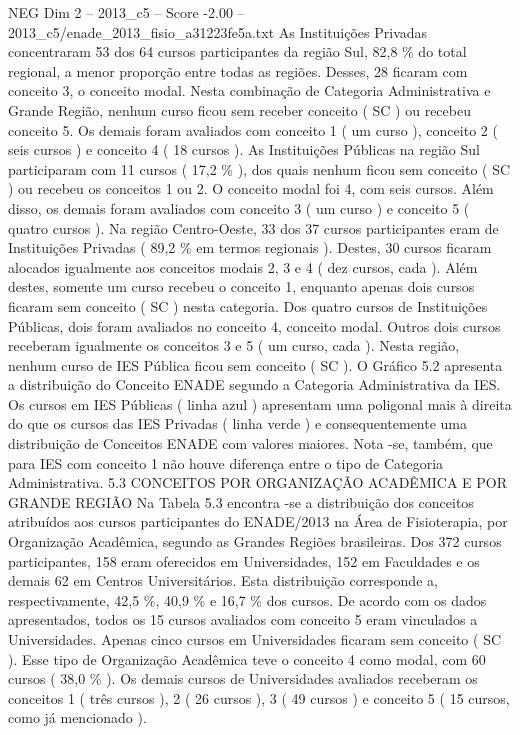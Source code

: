 \begin{textsample}{NEG Dim 2 – 2013\_c5 – Score -2.00 – 2013\_c5/enade\_2013\_fisio\_a31223fe5a.txt}
As Instituições Privadas concentraram 53 dos 64 cursos participantes da região Sul, 82,8 \% do total regional, a menor proporção entre todas as regiões.
Desses, 28 ficaram com conceito 3, o conceito modal.
Nesta combinação de Categoria Administrativa e Grande Região, nenhum curso ficou sem receber conceito ( SC ) ou recebeu conceito 5.
Os demais foram avaliados com conceito 1 ( um curso ), conceito 2 ( seis cursos ) e conceito 4 ( 18 cursos ).
As Instituições Públicas na região Sul participaram com 11 cursos ( 17,2 \% ), dos quais nenhum ficou sem conceito ( SC ) ou recebeu os conceitos 1 ou 2.
O conceito modal foi 4, com seis cursos.
Além disso, os demais foram avaliados com conceito 3 ( um curso ) e conceito 5 ( quatro cursos ).
Na região Centro-Oeste, 33 dos 37 cursos participantes eram de Instituições Privadas ( 89,2 \% em termos regionais ).
Destes, 30 cursos ficaram alocados igualmente aos conceitos modais 2, 3 e 4 ( dez cursos, cada ).
Além destes, somente um curso recebeu o conceito 1, enquanto apenas dois cursos ficaram sem conceito ( SC ) nesta categoria.
Dos quatro cursos de Instituições Públicas, dois foram avaliados no conceito 4, conceito modal.
Outros dois cursos receberam igualmente os conceitos 3 e 5 ( um curso, cada ).
Nesta região, nenhum curso de IES Pública ficou sem conceito ( SC ).
O Gráfico 5.2 apresenta a distribuição do Conceito ENADE segundo a Categoria Administrativa da IES.
Os cursos em IES Públicas ( linha azul ) apresentam uma poligonal mais à direita do que os cursos das IES Privadas ( linha verde ) e consequentemente uma distribuição de Conceitos ENADE com valores maiores.
Nota -se, também, que para IES com conceito 1 não houve diferença entre o tipo de Categoria Administrativa. 5.3 CONCEITOS POR ORGANIZAÇÃO ACADÊMICA E POR GRANDE REGIÃO Na Tabela 5.3 encontra -se a distribuição dos conceitos atribuídos aos cursos participantes do ENADE/2013 na Área de Fisioterapia, por Organização Acadêmica, segundo as Grandes Regiões brasileiras.
Dos 372 cursos participantes, 158 eram oferecidos em Universidades, 152 em Faculdades e os demais 62 em Centros Universitários.
Esta distribuição corresponde a, respectivamente, 42,5 \%, 40,9 \% e 16,7 \% dos cursos.
De acordo com os dados apresentados, todos os 15 cursos avaliados com conceito 5 eram vinculados a Universidades.
Apenas cinco cursos em Universidades ficaram sem conceito ( SC ).
Esse tipo de Organização Acadêmica teve o conceito 4 como modal, com 60 cursos ( 38,0 \% ).
Os demais cursos de Universidades avaliados receberam os conceitos 1 ( três cursos ), 2 ( 26 cursos ), 3 ( 49 cursos ) e conceito 5 ( 15 cursos, como já mencionado ).

\end{textsample}
